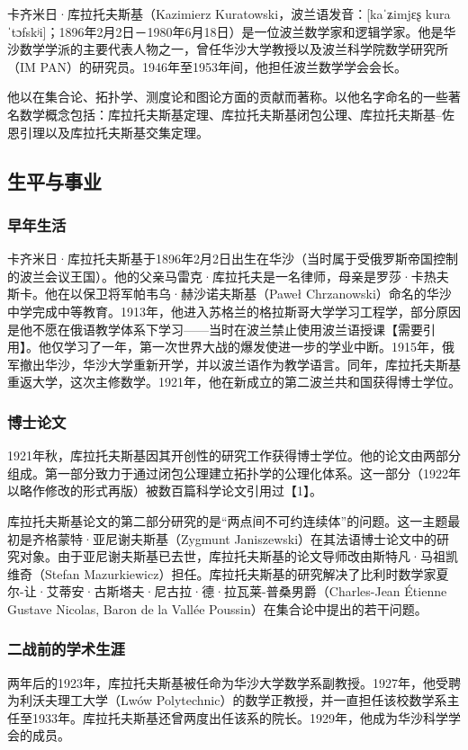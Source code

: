 
卡齐米日·库拉托夫斯基（Kazimierz Kuratowski，波兰语发音：[kaˈʑimjɛʂ kuraˈtɔfskʲi]；1896年2月2日－1980年6月18日）是一位波兰数学家和逻辑学家。他是华沙数学学派的主要代表人物之一，曾任华沙大学教授以及波兰科学院数学研究所（IM PAN）的研究员。1946年至1953年间，他担任波兰数学学会会长。

他以在集合论、拓扑学、测度论和图论方面的贡献而著称。以他名字命名的一些著名数学概念包括：库拉托夫斯基定理、库拉托夫斯基闭包公理、库拉托夫斯基–佐恩引理以及库拉托夫斯基交集定理。
\subsection{生平与事业}
\subsubsection{早年生活}
卡齐米日·库拉托夫斯基于1896年2月2日出生在华沙（当时属于受俄罗斯帝国控制的波兰会议王国）。他的父亲马雷克·库拉托夫是一名律师，母亲是罗莎·卡热夫斯卡。他在以保卫将军帕韦乌·赫沙诺夫斯基（Paweł Chrzanowski）命名的华沙中学完成中等教育。1913年，他进入苏格兰的格拉斯哥大学学习工程学，部分原因是他不愿在俄语教学体系下学习——当时在波兰禁止使用波兰语授课【需要引用】。他仅学习了一年，第一次世界大战的爆发使进一步的学业中断。1915年，俄军撤出华沙，华沙大学重新开学，并以波兰语作为教学语言。同年，库拉托夫斯基重返大学，这次主修数学。1921年，他在新成立的第二波兰共和国获得博士学位。
\subsubsection{博士论文}
1921年秋，库拉托夫斯基因其开创性的研究工作获得博士学位。他的论文由两部分组成。第一部分致力于通过闭包公理建立拓扑学的公理化体系。这一部分（1922年以略作修改的形式再版）被数百篇科学论文引用过【1】。

库拉托夫斯基论文的第二部分研究的是“两点间不可约连续体”的问题。这一主题最初是齐格蒙特·亚尼谢夫斯基（Zygmunt Janiszewski）在其法语博士论文中的研究对象。由于亚尼谢夫斯基已去世，库拉托夫斯基的论文导师改由斯特凡·马祖凯维奇（Stefan Mazurkiewicz）担任。库拉托夫斯基的研究解决了比利时数学家夏尔-让·艾蒂安·古斯塔夫·尼古拉·德·拉瓦莱-普桑男爵（Charles-Jean Étienne Gustave Nicolas, Baron de la Vallée Poussin）在集合论中提出的若干问题。
\subsubsection{二战前的学术生涯}
两年后的1923年，库拉托夫斯基被任命为华沙大学数学系副教授。1927年，他受聘为利沃夫理工大学（Lwów Polytechnic）的数学正教授，并一直担任该校数学系主任至1933年。库拉托夫斯基还曾两度出任该系的院长。1929年，他成为华沙科学学会的成员。

